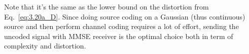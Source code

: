 Note that it's the same as the lower bound on the distortion from Eq.~\eqref{eq:3.20a_D}. Since doing source coding on a Gaussian (thus continuous) source and then perform channel coding requires a lot of effort, sending the uncoded signal with MMSE receiver is the optimal choice both in term of complexity and distortion.

